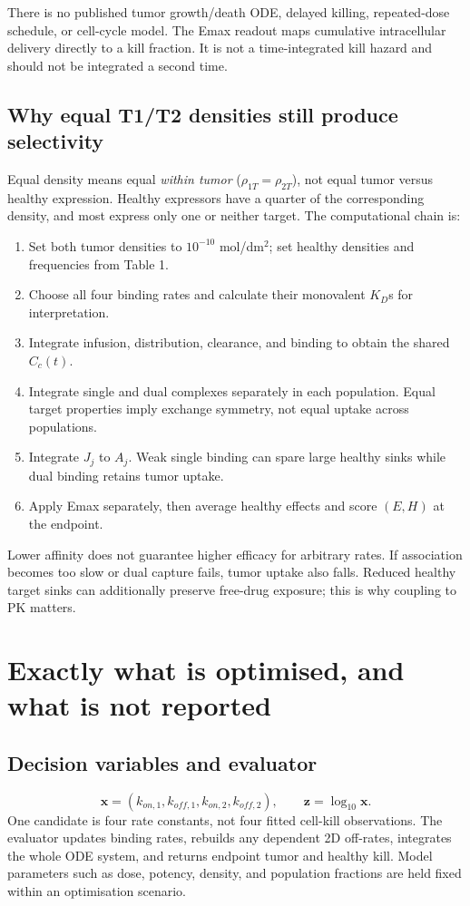 \documentclass[11pt,a4paper]{article}
\begin{document}
There is no published tumor growth/death ODE, delayed killing, repeated-dose schedule, or cell-cycle model. The Emax readout maps cumulative intracellular delivery directly to a kill fraction. It is not a time-integrated kill hazard and should not be integrated a second time.

\subsection{Why equal T1/T2 densities still produce selectivity}
Equal density means equal \emph{within tumor} ($\rho_{1T}=\rho_{2T}$), not equal tumor versus healthy expression. Healthy expressors have a quarter of the corresponding density, and most express only one or neither target. The computational chain is:
\begin{enumerate}
\item Set both tumor densities to $10^{-10}$ mol/dm$^2$; set healthy densities and frequencies from Table 1.
\item Choose all four binding rates and calculate their monovalent $K_D$s for interpretation.
\item Integrate infusion, distribution, clearance, and binding to obtain the shared $C_c(t)$.
\item Integrate single and dual complexes separately in each population. Equal target properties imply exchange symmetry, not equal uptake across populations.
\item Integrate $J_j$ to $A_j$. Weak single binding can spare large healthy sinks while dual binding retains tumor uptake.
\item Apply Emax separately, then average healthy effects and score $(E,H)$ at the endpoint.
\end{enumerate}
Lower affinity does not guarantee higher efficacy for arbitrary rates. If association becomes too slow or dual capture fails, tumor uptake also falls. Reduced healthy target sinks can additionally preserve free-drug exposure; this is why coupling to PK matters.

\section{Exactly what is optimised, and what is not reported}
\subsection{Decision variables and evaluator}
\begin{equation}
 \boldsymbol x=(k_{on,1},k_{off,1},k_{on,2},k_{off,2}),\qquad
 \boldsymbol z=\log_{10}\boldsymbol x.
\end{equation}
One candidate is four rate constants, not four fitted cell-kill observations. The evaluator updates binding rates, rebuilds any dependent 2D off-rates, integrates the whole ODE system, and returns endpoint tumor and healthy kill. Model parameters such as dose, potency, density, and population fractions are held fixed within an optimisation scenario.
\end{document}
